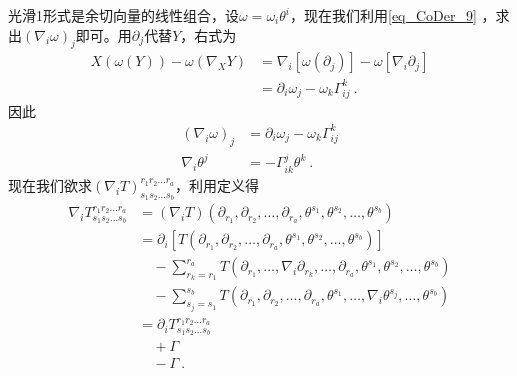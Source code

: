 光滑1形式是余切向量的线性组合，设$\omega=\omega_i\theta^i$，现在我们利用\autoref{eq_CoDer_9} ，求出$(\nabla_i\omega)_j$即可。用$\partial_j$代替$Y$，右式为
\begin{equation}
\begin{aligned}
X(\omega(Y))-\omega\left(\nabla_X Y\right)&=\nabla_i[\omega(\partial_j)]-\omega[\nabla_i\partial_j]\\
&=\partial_i\omega_j-\omega_k\Gamma^k_{ij}~.
\end{aligned}
\end{equation}
因此
\begin{equation}
\begin{aligned}
(\nabla_i\omega)_j&=\partial_i\omega_j-\omega_k\Gamma^k_{ij}\\
\nabla_i\theta^j&=-\Gamma^j_{ik}\theta^k~.
\end{aligned}
\end{equation}
现在我们欲求$(\nabla_iT)^{r_1r_2...r_a}_{s_1s_2...s_b}$，利用定义得
\begin{equation}
\begin{aligned}
\nabla_i T^{r_1 r_2 \ldots r_a}_{s_1 s_2 \ldots s_b} &= (\nabla_i T)(\partial_{r_1}, \partial_{r_2}, \ldots, \partial_{r_a}, \theta^{s_1}, \theta^{s_2}, \ldots, \theta^{s_b}) \\
&= \partial_i [T(\partial_{r_1}, \partial_{r_2}, \ldots, \partial_{r_a}, \theta^{s_1}, \theta^{s_2}, \ldots, \theta^{s_b}) ] \\
&\quad - \sum_{r_k=r_1}^{r_a} T(\partial_{r_1}, \ldots, \nabla_i \partial_{r_k}, \ldots, \partial_{r_a}, \theta^{s_1}, \theta^{s_2}, \ldots, \theta^{s_b}) \\
&\quad - \sum_{s_j=s_1}^{s_b} T(\partial_{r_1}, \partial_{r_2}, \ldots, \partial_{r_a}, \theta^{s_1}, \ldots, \nabla_i \theta^{s_j}, \ldots, \theta^{s_b})\\
&=\partial_iT^{r_1 r_2 \ldots r_a}_{s_1 s_2 \ldots s_b}\\
&\quad+\Gamma\\
&\quad-\Gamma~.
\end{aligned}
\end{equation}








